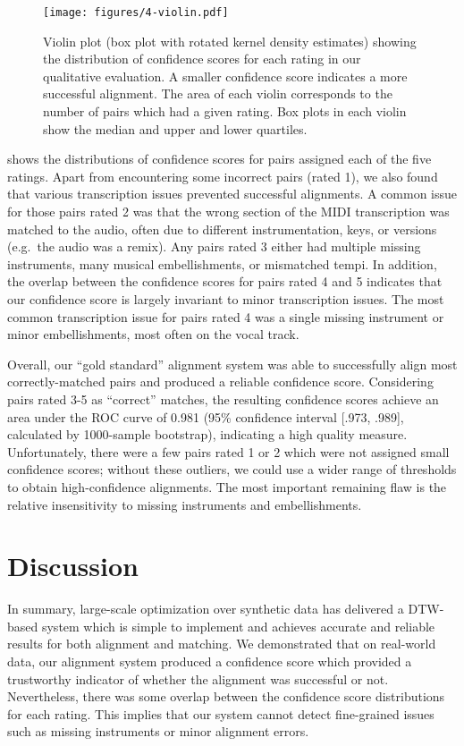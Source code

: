 \begin{figure}[t]
  \centering
  \texttt{[image: figures/4-violin.pdf]}
  \caption[Distributions of confidence scores for each rating]{Violin plot (box plot with rotated kernel density estimates) showing the distribution of confidence scores for each rating in our qualitative evaluation.
A smaller confidence score indicates a more successful alignment.
The area of each violin corresponds to the number of pairs which had a given rating.
Box plots in each violin show the median and upper and lower quartiles.}
  \label{fig:violin}
\end{figure}

 shows the distributions of confidence scores for pairs assigned each of the five ratings.
Apart from encountering some incorrect pairs (rated 1), we also found that various transcription issues prevented successful alignments.
A common issue for those pairs rated 2 was that the wrong section of the MIDI transcription was  matched to the audio, often due to different instrumentation, keys, or versions (e.g.\ the audio was a remix).
Any pairs rated 3 either had multiple missing instruments, many musical embellishments, or mismatched tempi.
In addition, the overlap between the confidence scores for pairs rated 4 and 5 indicates that our confidence score is largely invariant to minor transcription issues.
The most common transcription issue for pairs rated 4 was a single missing instrument or minor embellishments, most often on the vocal track.

Overall, our ``gold standard'' alignment system was able to successfully align most correctly-matched pairs and produced a reliable confidence score.
Considering pairs rated 3-5 as ``correct'' matches, the resulting confidence scores achieve an area under the ROC curve of 0.981 (95\% confidence interval [.973, .989], calculated by 1000-sample bootstrap), indicating a high quality measure.
Unfortunately, there were a few pairs rated 1 or 2 which were not assigned small confidence scores; without these outliers, we could use a wider range of thresholds to obtain high-confidence alignments.
The most important remaining flaw is the relative insensitivity to missing instruments and embellishments.

\section{Discussion}
\label{sec:discussion}

In summary, large-scale optimization over synthetic data has delivered a DTW-based system which is simple to implement and achieves accurate and reliable results for both alignment and matching.
We demonstrated that on real-world data, our alignment system produced a confidence score which provided a trustworthy indicator of whether the alignment was successful or not.
Nevertheless, there was some overlap between the confidence score distributions for each rating.
This implies that our system cannot detect fine-grained issues such as missing instruments or minor alignment errors.

